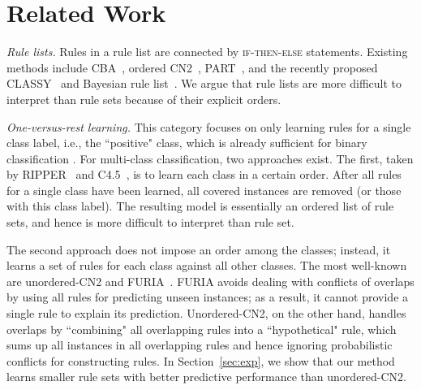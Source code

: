 \section{Related Work} \label{sec:related}

\noindent
\emph{Rule lists.}
Rules in a rule list are connected by \textsc{if-then-else} statements. Existing methods include CBA~\citep{liu1998CBA}, ordered CN2~\citep{clark1989cn2}, PART~\citep{frank1998generating}, and the recently proposed CLASSY~\citep{proencca2020interpretable} and Bayesian rule list~\citep{yang2017scalable-bayesian-rule-list}. We argue that rule lists are more difficult to interpret than rule sets because of their explicit orders. 

\smallskip \noindent
\emph{One-versus-rest learning.}
This category focuses on only learning rules for a single class label, i.e., the ``positive" class, which is already sufficient for binary classification \citep{wang2017bayesian,dash2018boolean,yang2021learning}. For multi-class classification, two approaches exist. The first, taken by RIPPER~\citep{cohen1995ripper} and C4.5~\citep{quinlan2014c4}, is to learn each class in a certain order. After all rules for a single class have been learned, all covered instances are removed (or those with this class label). The resulting model is essentially an ordered list of rule sets, and hence is more difficult to interpret than rule set.

The second approach does not impose an order among the classes; instead, it learns a set of rules for each class against all other classes. The most well-known are unordered-CN2 and FURIA~\citep{clark1991cn2Improve,huhn2009furia}. 
FURIA avoids dealing with conflicts of overlaps by using all rules for predicting unseen instances; as a result, it cannot provide a single rule to explain its prediction. Unordered-CN2, on the other hand, handles overlaps by ``combining" all overlapping rules into a ``hypothetical" rule, which sums up all instances in all overlapping rules and hence ignoring probabilistic conflicts for constructing rules. In Section~\ref{sec:exp}, we show that our method learns smaller rule sets with better predictive performance than unordered-CN2.

